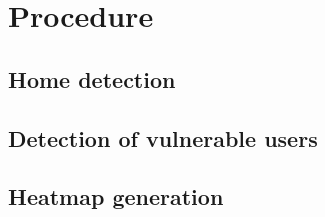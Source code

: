 \section{Procedure}
\subsection{Home detection}
\subsection{Detection of vulnerable users}
\subsection{Heatmap generation}